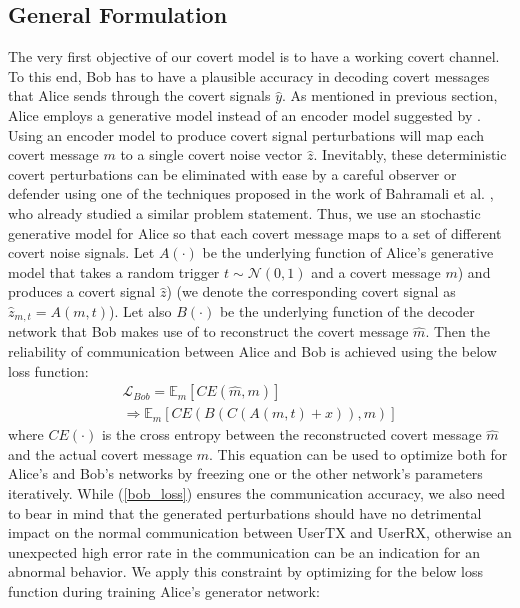 \subsection{General Formulation}
The very first objective of our covert model is to have a working covert channel. To this end, Bob has to have a plausible accuracy in decoding covert messages that Alice sends through the covert signals \(\hat{y}\). As mentioned in previous section, Alice employs a generative model instead of an encoder model suggested by \cite{mohammed2021adversarial}. Using an encoder model to produce covert signal perturbations will map each covert message \(m\) to a single covert noise vector \(\hat{z}\). Inevitably, these deterministic covert perturbations can be eliminated with ease by a careful observer or defender using one of the techniques proposed in the work of Bahramali et al. \cite{bahramali2021robust}, who already studied a similar problem statement. Thus, we use an stochastic generative model for Alice so that each covert message maps to a set of different covert noise signals. Let \(A(\cdot)\) be the underlying function of Alice's generative model that takes a random trigger \(t \sim \mathcal{N}(0, 1)\) and a covert message \(m\)) and produces a covert signal \(\hat{z}\)) (we denote the corresponding covert signal as \(\hat{z}_{m, t} = A(m, t)\)). Let also  \(B(\cdot)\) be the underlying function of the decoder network that Bob makes use of to reconstruct the covert message \(\hat{m}\). Then the reliability of communication between Alice and Bob is achieved using the below loss function:
\begin{equation}
	\begin{array}{l} \label{bob_loss}
	\mathcal{L}_{Bob} = \mathbb{E}_{m}[CE(\hat{m}, m)] \\ \Rightarrow \mathbb{E}_{m}[CE(B(C(A(m, t) + x)), m)]
	\end{array}
\end{equation}
where \(CE(\cdot)\) is the cross entropy between the reconstructed covert message \(\hat{m}\) and the actual covert message \(m\). This equation can be used to optimize both for Alice's and Bob's networks by freezing one or the other network's parameters iteratively. While (\ref{bob_loss}) ensures the communication accuracy, we also need to bear in mind that the generated perturbations should have no detrimental impact on the normal communication between UserTX and UserRX, otherwise an unexpected high error rate in the communication can be an indication for an abnormal behavior. We apply this constraint by optimizing for the below loss function during training Alice's generator network:
